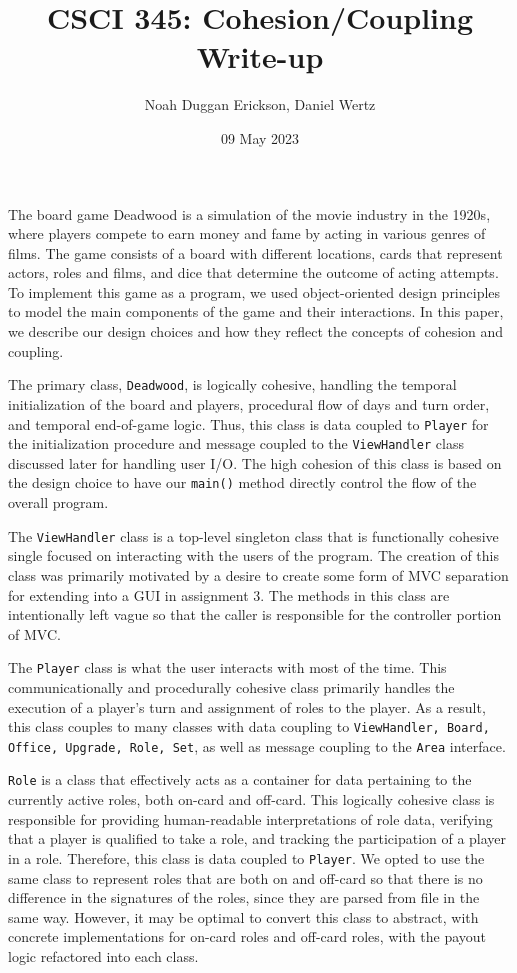 \documentclass[letterpaper, twoside]{report}
\title{CSCI 345: Cohesion/Coupling Write-up}
\author{Noah Duggan Erickson, Daniel Wertz}
\date{09 May 2023}
\begin{document}
\maketitle

The board game Deadwood is a simulation of the movie industry in the 1920s, where players compete to earn money and fame by acting in various genres of films. The game consists of a board with different locations, cards that represent actors, roles and films, and dice that determine the outcome of acting attempts. To implement this game as a program, we used object-oriented design principles to model the main components of the game and their interactions. In this paper, we describe our design choices and how they reflect the concepts of cohesion and coupling.


The primary class, \texttt{Deadwood}, is logically cohesive, handling the temporal initialization of the board and players, procedural flow of days and turn order, and temporal end-of-game logic. Thus, this class is data coupled to \texttt{Player} for the initialization procedure and message coupled to the \texttt{ViewHandler}  class discussed later for handling user I/O. The high cohesion of this class is based on the design choice to have our \texttt{main()} method directly control the flow of the overall program. 


The \texttt{ViewHandler} class is a top-level singleton class that is functionally cohesive single focused on interacting with the users of the program. The creation of this class was primarily motivated by a desire to create some form of MVC separation for extending into a GUI in assignment 3. The methods in this class are intentionally left vague so that the caller is responsible for the controller portion of MVC.


The \texttt{Player} class is what the user interacts with most of the time. This communicationally and procedurally cohesive class primarily handles the execution of a player's turn  and assignment of roles to the player. As a result, this class couples to many classes with data coupling to \texttt{ViewHandler, Board, Office, Upgrade, Role, Set}, as well as message coupling to the \texttt{Area} interface.


\texttt{Role} is a class that effectively acts as a container for data pertaining to the currently active roles, both on-card and off-card. This logically cohesive class is responsible for providing human-readable interpretations of role data, verifying that a player is qualified to take a role, and tracking the participation of a player in a role. Therefore, this class is data coupled to \texttt{Player}. We opted to use the same class to represent roles that are both on and off-card so that there is no difference in the signatures of the roles, since they are parsed from file in the same way. However, it may be optimal to convert this class to abstract, with concrete implementations for on-card roles and off-card roles, with the payout logic refactored into each class.
\end{document}
